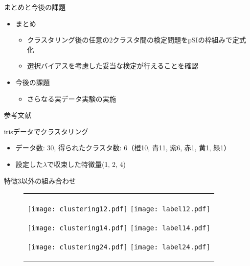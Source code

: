 \documentclass[dvipdfmx, 10pt]{beamer}
\begin{document}
\begin{frame}{まとめと今後の課題}
    \begin{itemize}
      \item まとめ
      \begin{itemize}
        \item クラスタリング後の任意の2クラスタ間の検定問題をpSIの枠組みで定式化
        \item 選択バイアスを考慮した妥当な検定が行えることを確認
      \end{itemize}
    \end{itemize}
    \begin{itemize}
      \item 今後の課題
      \begin{itemize}
        \item さらなる実データ実験の実施
      \end{itemize}
    \end{itemize}
\end{frame}


\begin{frame}{参考文献}
    \printbibliography
\end{frame}

\begin{frame}[noframenumbering]{irisデータでクラスタリング}
    \begin{itemize}
      \item データ数: 30, 得られたクラスタ数: 6（橙\alert{10}, 青11, 紫6, 赤1, 黄1, 緑1）
      \item 設定した$\lambda$で収束した特徴量(1, 2, 4)
    \end{itemize}
    特徴3以外の組み合わせ
    \begin{figure}
      \begin{tabular}{c}
        \begin{minipage}{0.3\hsize}
          \texttt{[image: clustering12.pdf]}
          \texttt{[image: label12.pdf]}
        \end{minipage}
        \begin{minipage}{0.3\hsize}
          \texttt{[image: clustering14.pdf]}
          \texttt{[image: label14.pdf]}
        \end{minipage}
        \begin{minipage}{0.3\hsize}
          \texttt{[image: clustering24.pdf]}
          \texttt{[image: label24.pdf]}
        \end{minipage}
      \end{tabular}
    \end{figure}
    
\end{frame}
\end{document}
